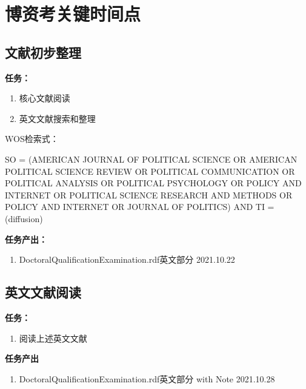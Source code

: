 \documentclass[
  12pt,
]{ctexart}
\providecommand{\tightlist}{%
  \setlength{\itemsep}{0pt}\setlength{\parskip}{0pt}}
\begin{document}
\hypertarget{ux535aux8d44ux8003ux5173ux952eux65f6ux95f4ux70b9}{%
\section{博资考关键时间点}\label{ux535aux8d44ux8003ux5173ux952eux65f6ux95f4ux70b9}}

\hypertarget{ux6587ux732eux521dux6b65ux6574ux7406}{%
\subsection{文献初步整理}\label{ux6587ux732eux521dux6b65ux6574ux7406}}

\textbf{任务：}

\begin{enumerate}
\def\labelenumi{\arabic{enumi}.}
\item
  核心文献阅读
\item
  英文文献搜索和整理
\end{enumerate}

WOS检索式：

SO = (AMERICAN JOURNAL OF POLITICAL SCIENCE OR AMERICAN POLITICAL SCIENCE REVIEW OR POLITICAL COMMUNICATION OR POLITICAL ANALYSIS OR POLITICAL PSYCHOLOGY OR POLICY AND INTERNET OR POLITICAL SCIENCE RESEARCH AND METHODS OR POLICY AND INTERNET OR JOURNAL OF POLITICS) AND TI = (diffusion)

\textbf{任务产出：}

\begin{enumerate}
\def\labelenumi{\arabic{enumi}.}
\tightlist
\item
  DoctoralQualificationExamination.rdf英文部分 \hfill 2021.10.22
\end{enumerate}

\hypertarget{ux82f1ux6587ux6587ux732eux9605ux8bfb}{%
\subsection{英文文献阅读}\label{ux82f1ux6587ux6587ux732eux9605ux8bfb}}

\textbf{任务：}

\begin{enumerate}
\def\labelenumi{\arabic{enumi}.}
\tightlist
\item
  阅读上述英文文献
\end{enumerate}

\textbf{任务产出}

\begin{enumerate}
\def\labelenumi{\arabic{enumi}.}
\tightlist
\item
  DoctoralQualificationExamination.rdf英文部分 with Note \hfill 2021.10.28
\end{enumerate}
\end{document}
